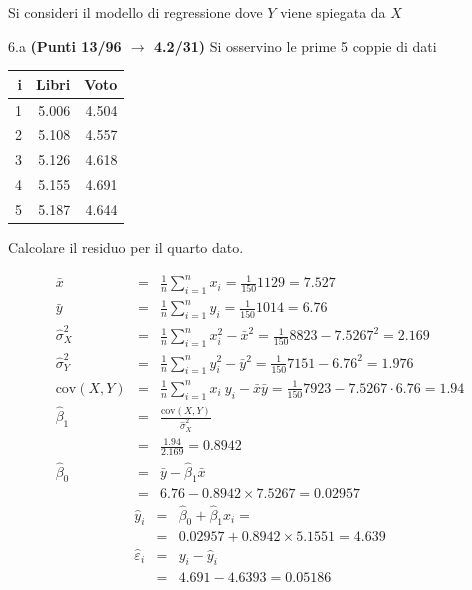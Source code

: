 \documentclass[
  11pt,
]{book}
\theoremstyle{mytheoremstyle}
\theoremstyle{mydefstyle}
\newenvironment{sol}
  {
  \begin{tcolorbox}[enhanced,breakable,arc=0.1mm,boxrule=1pt,colback=white,colframe=iblue,
  title=\bf \fontfamily{lmss}\selectfont \hspace{.5 cm} Soluzione,drop fuzzy shadow]

}{
\end{tcolorbox}
  }
\begin{document}
Si consideri il modello di regressione dove \(Y\) viene spiegata da \(X\)

6.a \textbf{(Punti 13/96 \(\rightarrow\) 4.2/31)} Si osservino le prime 5 coppie di dati

\begin{table}[H]
\centering
\begin{tabular}{rrr}
\toprule
i & Libri & Voto\\
\midrule
1 & 5.006 & 4.504\\
2 & 5.108 & 4.557\\
3 & 5.126 & 4.618\\
4 & 5.155 & 4.691\\
5 & 5.187 & 4.644\\
\bottomrule
\end{tabular}
\end{table}

Calcolare il residuo per il quarto dato.

\begin{sol}
\begin{eqnarray*}
           \bar x &=&\frac 1 n\sum_{i=1}^n x_i = \frac {1}{ 150 }  1129 =  7.527 \\
           \bar y &=&\frac 1 n\sum_{i=1}^n y_i = \frac {1}{ 150 }  1014 =  6.76 \\
           \hat\sigma_X^2&=&\frac 1 n\sum_{i=1}^n x_i^2-\bar x^2=\frac {1}{ 150 }  8823  - 7.5267 ^2= 2.169 \\
           \hat\sigma_Y^2&=&\frac 1 n\sum_{i=1}^n y_i^2-\bar y^2=\frac {1}{ 150 }  7151  - 6.76 ^2= 1.976 \\
           \text{cov}(X,Y)&=&\frac 1 n\sum_{i=1}^n x_i~y_i-\bar x\bar y=\frac {1}{ 150 }  7923 - 7.5267 \cdot 6.76 = 1.94 \\
           \hat\beta_1 &=& \frac{\text{cov}(X,Y)}{\hat\sigma_X^2} \\
                    &=& \frac{ 1.94 }{ 2.169 }  =  0.8942 \\
           \hat\beta_0 &=& \bar y - \hat\beta_1 \bar x\\
                    &=&  6.76 - 0.8942 \times  7.5267 = 0.02957 
         \end{eqnarray*}\begin{eqnarray*}
\hat y_i &=&\hat\beta_0+\hat\beta_1 x_i=\\ 
&=& 0.02957 + 0.8942 \times 5.1551 = 4.639 \\ 
\hat \varepsilon_i &=& y_i-\hat y_i\\ 
&=& 4.691 - 4.6393 = 0.05186  
\end{eqnarray*}

\end{sol}
\end{document}
